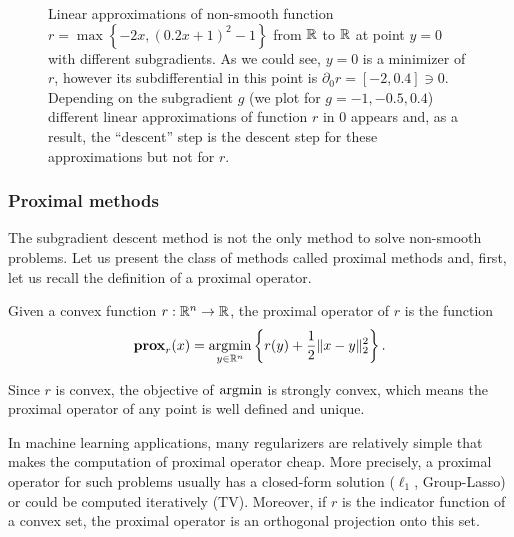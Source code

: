 \begin{figure}[H]
    \centering
    
    \caption{Linear approximations of non-smooth function $r = \max\left\{-2x, (0.2x+1)^2 - 1\right\}$ from $\mathbb{R}$ to $\mathbb{R}$
    at point $y = 0$ with different subgradients. As we could see, $y=0$ is a minimizer of $r$, however its subdifferential in this point is $\partial_0 r = [-2, 0.4]\ni0$. Depending on the subgradient $g$ (we plot for $g=-1, -0.5, 0.4$) different linear approximations of function $r$ in $0$ appears and, as a result, the ``descent'' step is the descent step for these approximations but not for $r$.}
    \label{fig:nonsmooth_approx}
\end{figure}


\subsubsection{Proximal methods}
The subgradient descent method is not the only method to solve non-smooth problems. Let us present the class of methods called proximal methods and, first, let us recall the definition of a proximal operator.

\begin{definition}\label{def:proximal_operator}
Given a convex function $r:\mathbb{R}^n\rightarrow \mathbb{R}$, the proximal operator of $r$ is the function
\begin{equation}
\mathbf{prox}_r(x) = \operatorname*{argmin}_{y\in\mathbb{R}^n}\left\{r(y) + \frac{1}{2}\|x-y\|_2^2\right\}.
\end{equation}
\end{definition}
Since $r$ is convex, the objective of $\operatorname*{argmin}$ is strongly convex, which means the proximal operator of any point is well defined and unique.

In machine learning applications, many regularizers are relatively simple that makes the computation of proximal operator cheap. More precisely, a proximal operator for such problems usually has a closed-form solution ($\ell_1$, Group-Lasso) or could be computed iteratively (TV). Moreover, if $r$ is the indicator function of a convex set, the proximal operator is an orthogonal projection onto this set. 

